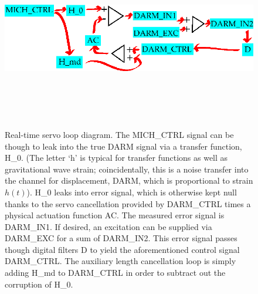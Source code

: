 
	\begin{figure}
	\begin{center}
	\includegraphics[height=80mm, width=148mm]{servo_loop.eps}
	\caption{Real-time servo loop diagram. The MICH\_CTRL signal can be though to leak into the true DARM signal via a transfer function, H\_0. (The letter `h' is typical for transfer functions as well as gravitational wave strain; coincidentally, this is a noise transfer into the channel for displacement, DARM, which is proportional to strain $h(t)$). H\_0 leaks into error signal, which is otherwise kept null thanks to the servo cancellation provided by DARM\_CTRL times a physical actuation function AC. The measured error signal is DARM\_IN1. If desired, an excitation can be supplied via DARM\_EXC for a sum of DARM\_IN2. This error signal passes though digital filters D to yield the aforementioned control signal DARM\_CTRL. The auxiliary length cancellation loop is simply adding H\_md to DARM\_CTRL in order to subtract out the corruption of H\_0.}
	\label{servo_loop_realtime}
	\end{center}
	\end{figure}

